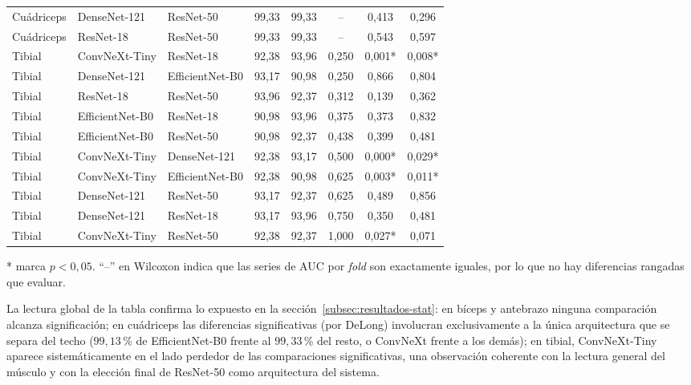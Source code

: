 \documentclass[12pt]{extarticle}
\numberwithin{equation}{section}
\begin{document}
\begin{table}[H]
\begin{tabular}{lllccccc}
Cuádriceps & DenseNet-121    & ResNet-50       & 99{,}33 & 99{,}33 & --      & 0{,}413 & 0{,}296 \\
Cuádriceps & ResNet-18       & ResNet-50       & 99{,}33 & 99{,}33 & --      & 0{,}543 & 0{,}597 \\
\midrule
Tibial    & ConvNeXt-Tiny   & ResNet-18       & 92{,}38 & 93{,}96 & 0{,}250 & 0{,}001{*} & 0{,}008{*} \\
Tibial    & DenseNet-121    & EfficientNet-B0 & 93{,}17 & 90{,}98 & 0{,}250 & 0{,}866 & 0{,}804 \\
Tibial    & ResNet-18       & ResNet-50       & 93{,}96 & 92{,}37 & 0{,}312 & 0{,}139 & 0{,}362 \\
Tibial    & EfficientNet-B0 & ResNet-18       & 90{,}98 & 93{,}96 & 0{,}375 & 0{,}373 & 0{,}832 \\
Tibial    & EfficientNet-B0 & ResNet-50       & 90{,}98 & 92{,}37 & 0{,}438 & 0{,}399 & 0{,}481 \\
Tibial    & ConvNeXt-Tiny   & DenseNet-121    & 92{,}38 & 93{,}17 & 0{,}500 & 0{,}000{*} & 0{,}029{*} \\
Tibial    & ConvNeXt-Tiny   & EfficientNet-B0 & 92{,}38 & 90{,}98 & 0{,}625 & 0{,}003{*} & 0{,}011{*} \\
Tibial    & DenseNet-121    & ResNet-50       & 93{,}17 & 92{,}37 & 0{,}625 & 0{,}489 & 0{,}856 \\
Tibial    & DenseNet-121    & ResNet-18       & 93{,}17 & 93{,}96 & 0{,}750 & 0{,}350 & 0{,}481 \\
Tibial    & ConvNeXt-Tiny   & ResNet-50       & 92{,}38 & 92{,}37 & 1{,}000 & 0{,}027{*} & 0{,}071 \\
\bottomrule
\end{tabular}

\smallskip
\footnotesize{{*} marca $p<0{,}05$. ``--'' en Wilcoxon indica que las series de AUC por \textit{fold} son exactamente iguales, por lo que no hay diferencias rangadas que evaluar.}
\end{table}

La lectura global de la tabla confirma lo expuesto en la sección~\ref{subsec:resultados-stat}: en bíceps y antebrazo ninguna comparación alcanza significación; en cuádriceps las diferencias significativas (por DeLong) involucran exclusivamente a la única arquitectura que se separa del techo ($99{,}13$\,\% de EfficientNet-B0 frente al $99{,}33$\,\% del resto, o ConvNeXt frente a los demás); en tibial, ConvNeXt-Tiny aparece sistemáticamente en el lado perdedor de las comparaciones significativas, una observación coherente con la lectura general del músculo y con la elección final de ResNet-50 como arquitectura del sistema.
\end{document}
